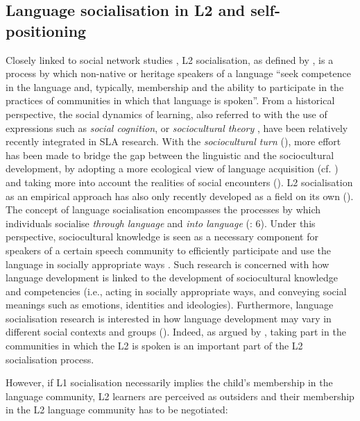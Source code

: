 \documentclass[output=paper]{langscibook}
\begin{document}
\subsection{Language socialisation in L2 and self-positioning} %

Closely linked to social network studies \citep{Coleman2015}, L2 socialisation, as defined by \citet[564]{Duff2011}, is a process by which non-native or heritage speakers of a language “seek competence in the language and, typically, membership and the ability to participate in the practices of communities in which that language is spoken”. From a historical perspective, the social dynamics of learning, also referred to with the use of expressions such as \textit{social cognition}, or \textit{sociocultural theory} \citep[6]{Duff2019}, have been relatively recently integrated in SLA research. With the \textit{sociocultural turn} (\citealt{FirthWagner1997, Block2007b, Véronique2013Socialization}), more effort has been made to bridge the gap between the linguistic and the sociocultural development, by adopting a more ecological view of language acquisition (cf. \citealt{SteffensenKramsch2017}) and taking more into account the realities of social encounters (\citealt{DiaoMaa2019, Duff2019}). L2 socialisation as an empirical approach has also only recently developed as a field on its own (\citealt{Kinginger2017, DiaoMaa2019}). The concept of language socialisation encompasses the processes by which individuals socialise \textit{through language} and \textit{into language} (\citealt{OchsSchieffelin2017}: 6). Under this perspective, sociocultural knowledge is seen as a necessary component for speakers of a certain speech community to efficiently participate and use the language in socially appropriate ways \citep{Gumperz1964}. Such research is concerned with how language development is linked to the development of sociocultural knowledge and competencies (i.e., acting in socially appropriate ways, and conveying social meanings such as emotions, identities and ideologies). Furthermore, language socialisation research is interested in how language development may vary in different social contexts and groups (\citealt{DuffMay2017}). Indeed, as argued by \citet{Duff2011}, taking part in the communities in which the L2 is spoken is an important part of the L2 socialisation process.

However, if L1 socialisation necessarily implies the child’s membership in the language community, L2 learners are perceived as outsiders and their membership in the L2 language community has to be negotiated:
\end{document}
